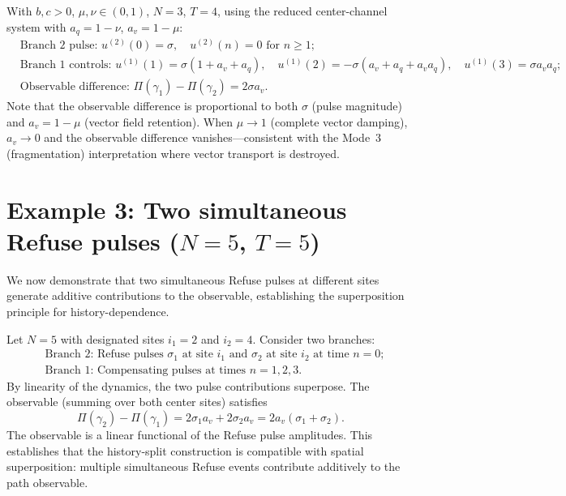 \documentclass[12pt, oneside]{memoir}
\newcommand{\aq}{a_q}
\newcommand{\av}{a_v}
\begin{document}
\begin{example}
\label{ex:full}
With $b, c > 0$, $\mu, \nu \in (0,1)$, $N=3$, $T=4$, using the reduced center-channel
system with $\aq = 1-\nu$, $\av = 1-\mu$:
\begin{align*}
  &\text{Branch 2 pulse: } u^{(2)}(0) = \sigma,\quad u^{(2)}(n) = 0 \text{ for } n \ge 1; \\
  &\text{Branch 1 controls: } u^{(1)}(1) = \sigma(1+\av+\aq),\quad
    u^{(1)}(2) = -\sigma(\av+\aq+\av\aq),\quad u^{(1)}(3) = \sigma\av\aq; \\
  &\text{Observable difference: } \Pi(\gamma_1) - \Pi(\gamma_2) = 2\sigma\av.
\end{align*}
Note that the observable difference is proportional to both $\sigma$ (pulse magnitude)
and $\av = 1-\mu$ (vector field retention).  When $\mu \to 1$ (complete vector damping),
$\av \to 0$ and the observable difference vanishes---consistent with the Mode~3
(fragmentation) interpretation where vector transport is destroyed.
\end{example}

\section{Example 3: Two simultaneous Refuse pulses ($N=5$, $T=5$)}

We now demonstrate that two simultaneous Refuse pulses at different sites generate
additive contributions to the observable, establishing the superposition principle for
history-dependence.

\begin{example}
\label{ex:two-pulse}
Let $N=5$ with designated sites $i_1 = 2$ and $i_2 = 4$.  Consider two branches:
\begin{align*}
  &\text{Branch 2: } \text{Refuse pulses } \sigma_1 \text{ at site } i_1 \text{ and }
    \sigma_2 \text{ at site } i_2 \text{ at time } n=0; \\
  &\text{Branch 1: } \text{Compensating pulses at times } n = 1, 2, 3.
\end{align*}
By linearity of the dynamics, the two pulse contributions superpose.  The observable
(summing over both center sites) satisfies
\[
  \Pi(\gamma_2) - \Pi(\gamma_1) = 2\sigma_1 \av + 2\sigma_2 \av = 2\av(\sigma_1 + \sigma_2).
\]
The observable is a linear functional of the Refuse pulse amplitudes.  This establishes
that the history-split construction is compatible with spatial superposition: multiple
simultaneous Refuse events contribute additively to the path observable.
\end{example}
\end{document}
